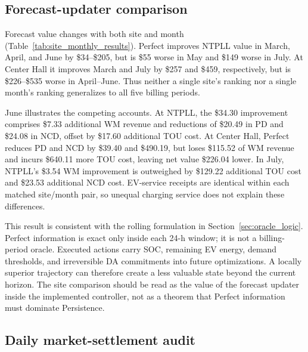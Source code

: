 \documentclass[final,5p,times]{elsarticle}
\begin{document}
\subsection{Forecast-updater comparison}
\label{sec:site_forecast_results}

Forecast value changes with both site and month (Table~\ref{tab:site_monthly_results}).
Perfect improves NTPLL value in March, April, and June by \$34--\$205, but is
\$55 worse in May and \$149 worse in July. At Center Hall it improves March
and July by \$257 and \$459, respectively, but is \$226--\$535 worse in April--June.
Thus neither a single site's ranking nor a single month's ranking generalizes
to all five billing periods.

June illustrates the competing accounts. At NTPLL, the \$34.30 improvement
comprises \$7.33 additional WM revenue and reductions of \$20.49 in PD and
\$24.08 in NCD, offset by \$17.60 additional TOU cost. At Center Hall, Perfect
reduces PD and NCD by \$39.40 and \$490.19, but loses \$115.52 of WM revenue
and incurs \$640.11 more TOU cost, leaving net value \$226.04 lower. In July,
NTPLL's \$3.54 WM improvement is outweighed by \$129.22 additional TOU cost
and \$23.53 additional NCD cost. EV-service receipts are identical
within each matched site/month pair, so unequal charging service does not
explain these differences.

This result is consistent with the rolling formulation in
Section~\ref{sec:oracle_logic}. Perfect information is exact only inside each
24-h window; it is not a billing-period oracle. Executed actions carry SOC,
remaining EV energy, demand thresholds, and irreversible DA commitments into
future optimizations. A locally superior trajectory can therefore create a
less valuable state beyond the current horizon. The site comparison should be
read as the value of the forecast updater inside the implemented controller,
not as a theorem that Perfect information must dominate Persistence.



\subsection{Daily market-settlement audit}
\label{sec:site_daily_audit}
\end{document}
